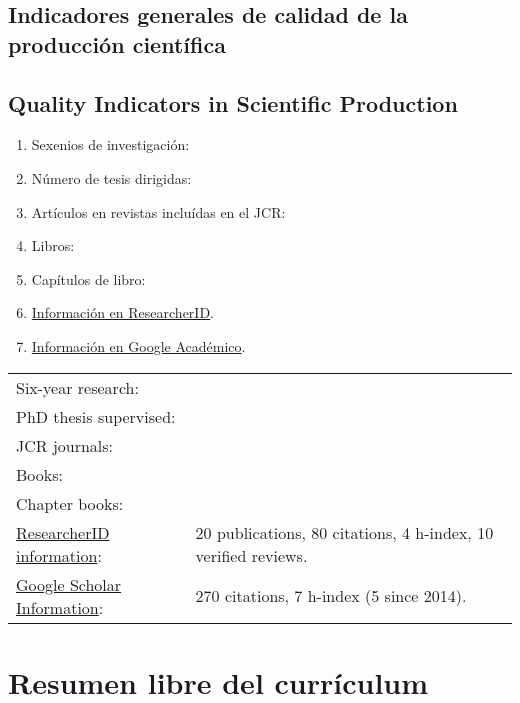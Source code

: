\documentclass[a4paper]{article}
\def\english{1}
\begin{document}
\ifx\english\undefined
\subsection{Indicadores generales de calidad de la producción científica}
\else
\subsection{Quality Indicators in Scientific Production}
\fi

\ifx\english\undefined
\begin{enumerate}
\item Sexenios de investigación: 
\item Número de tesis dirigidas: 
\item Artículos en revistas incluídas en el JCR: 
\item Libros: 
\item Capítulos de libro: 
\item \href{http://www.researcherid.com/rid/\ResearcherID}{Información en ResearcherID}.
\item \href{https://scholar.google.es/citations?hl=es&user=\GoogleUser}{Información en Google Académico}.
\end{enumerate}
\else
\begin{tabular}{ll}
Six-year research: &  \\
PhD thesis supervised: &  \\
JCR journals: &  \\
Books: &  \\
Chapter books: &  \\
\href{http://www.researcherid.com/rid/\ResearcherID}{ResearcherID information}: & 20 publications, 80 citations, 4 h-index, 10 verified reviews.\\
\href{https://scholar.google.es/citations?hl=es&user=\GoogleUser}{Google Scholar Information}: & 270 citations, 7 h-index (5 since 2014). 
\end{tabular}
\fi

\ifx\english\undefined
\section{Resumen libre del currículum}
\else
\end{document}
